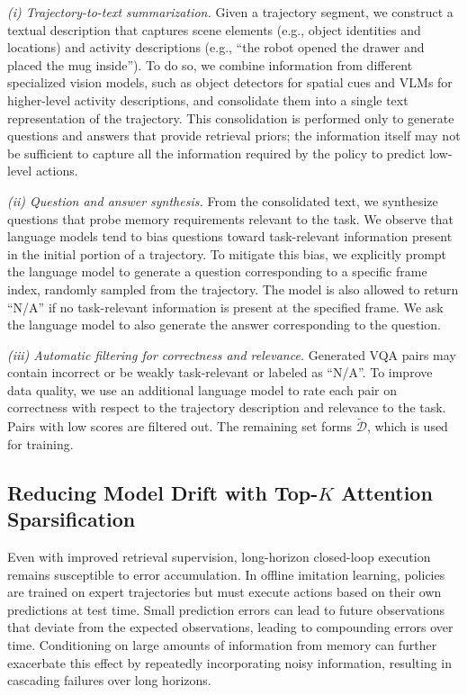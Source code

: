 \textit{(i) Trajectory-to-text summarization.}
Given a trajectory segment, we construct a textual description that captures scene elements (e.g., object identities and locations) and activity descriptions (e.g., ``the robot opened the drawer and placed the mug inside'').
To do so, we combine information from different specialized vision models, such as object detectors for spatial cues and VLMs for higher-level activity descriptions, and consolidate them into a single text representation of the trajectory.
This consolidation is performed only to generate questions and answers that provide retrieval priors; the information itself may not be sufficient to capture all the information required by the policy to predict low-level actions.

\textit{(ii) Question and answer synthesis.}
From the consolidated text, we synthesize questions that probe memory requirements relevant to the task.
We observe that language models tend to bias questions toward task-relevant information present in the initial portion of a trajectory.
To mitigate this bias, we explicitly prompt the language model to generate a question corresponding to a specific frame index, randomly sampled from the trajectory.
The model is also allowed to return ``N/A'' if no task-relevant information is present at the specified frame. We ask the language model to also generate the answer corresponding to the question.

\textit{(iii) Automatic filtering for correctness and relevance.}
Generated VQA pairs may contain incorrect or be weakly task-relevant or labeled as ``N/A''.
To improve data quality, we use an additional language model to rate each pair on correctness with respect to the trajectory description and relevance to the task.
Pairs with low scores are filtered out.
The remaining set forms $\widetilde{\mathcal{D}}$, which is used for training.


\subsection{Reducing Model Drift with Top-$K$ Attention Sparsification}
\label{sec:method:topk}
Even with improved retrieval supervision, long-horizon closed-loop execution remains susceptible to error accumulation.
In offline imitation learning, policies are trained on expert trajectories but must execute actions based on their own predictions at test time.
Small prediction errors can lead to future observations that deviate from the expected observations, leading to compounding errors over time.
Conditioning on large amounts of information from memory can further exacerbate this effect by repeatedly incorporating noisy information, resulting in cascading failures over long horizons.

